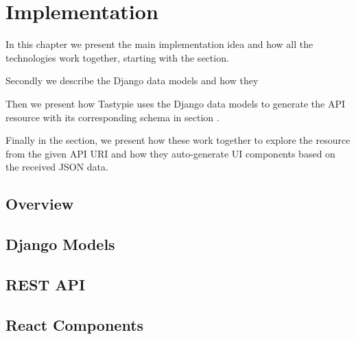 \chapter{Implementation}
\label{chapter:implementation}

In this chapter we present the main implementation idea and how all the technologies work together, starting with the  section.

Secondly we describe the Django data models and how they 

Then we present how Tastypie uses the Django data models to generate the API resource with its corresponding schema in section .

Finally in the  section, we present how these work together to explore the resource from the given API URI and how they auto-generate UI components based on the received JSON data.

\section{Overview}
\label{sec:overview}

%


\section{Django Models}
\label{sec:django-models}


\section{REST API}
\label{sec:api}


\section{React Components}
\label{sec:react0components}

